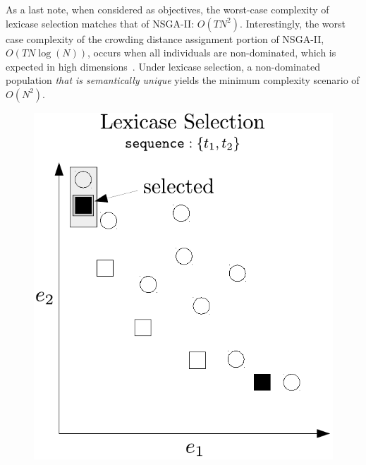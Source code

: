 \documentclass[twoside]{article}
\begin{document}
As a last note, when considered as objectives, the worst-case complexity of lexicase selection matches that of NSGA-II: $O(TN^2)$. Interestingly, the worst case complexity of the crowding distance assignment portion of NSGA-II, $O(TN\log(N))$, occurs when all individuals are non-dominated, which is expected in high dimensions~\citep{farina_optimal_2002, wagner_pareto-_2007}. Under lexicase selection, a non-dominated population {\it that is semantically unique} yields the minimum complexity scenario of $O(N^2)$. 

\begin{figure}[htb]

\begin{minipage}{0.49\textwidth}
\centering
  \includegraphics[width = \textwidth]{figs/lex_pareto.pdf}

\end{minipage}
\end{figure}
\end{document}
